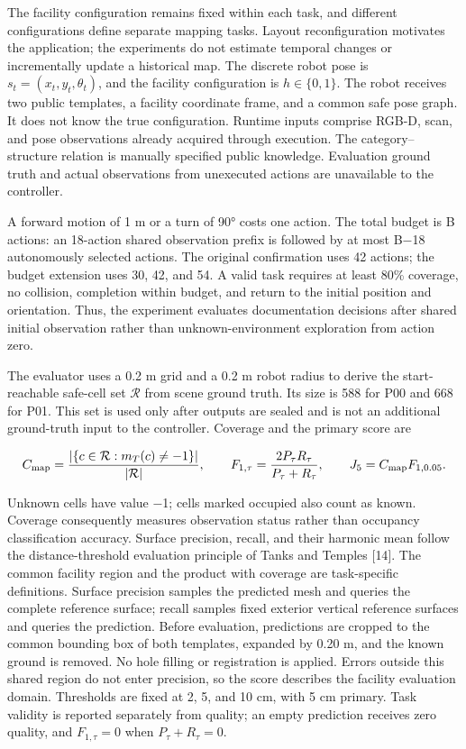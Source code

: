 \documentclass[11pt,a4paper]{article}
\begin{document}
The facility configuration remains fixed within each task, and different configurations define separate mapping tasks. Layout reconfiguration motivates the application; the experiments do not estimate temporal changes or incrementally update a historical map. The discrete robot pose is \(s_t=(x_t,y_t,\theta_t)\), and the facility configuration is \(h\in\{0,1\}\). The robot receives two public templates, a facility coordinate frame, and a common safe pose graph. It does not know the true configuration. Runtime inputs comprise RGB-D, scan, and pose observations already acquired through execution. The category--structure relation is manually specified public knowledge. Evaluation ground truth and actual observations from unexecuted actions are unavailable to the controller.

A forward motion of 1 m or a turn of 90° costs one action. The total budget is B actions: an 18-action shared observation prefix is followed by at most B−18 autonomously selected actions. The original confirmation uses 42 actions; the budget extension uses 30, 42, and 54. A valid task requires at least 80\% coverage, no collision, completion within budget, and return to the initial position and orientation. Thus, the experiment evaluates documentation decisions after shared initial observation rather than unknown-environment exploration from action zero.

The evaluator uses a 0.2 m grid and a 0.2 m robot radius to derive the start-reachable safe-cell set \(\mathcal R\) from scene ground truth. Its size is 588 for P00 and 668 for P01. This set is used only after outputs are sealed and is not an additional ground-truth input to the controller. Coverage and the primary score are

\[
C_{\rm map}=\frac{|\{c\in\mathcal R:m_T(c)\ne-1\}|}{|\mathcal R|},
\qquad F_{1,\tau}=\frac{2P_\tau R_\tau}{P_\tau+R_\tau},
\qquad J_5=C_{\rm map}F_{1,0.05}.
\]

Unknown cells have value −1; cells marked occupied also count as known. Coverage consequently measures observation status rather than occupancy classification accuracy. Surface precision, recall, and their harmonic mean follow the distance-threshold evaluation principle of Tanks and Temples {[}14{]}. The common facility region and the product with coverage are task-specific definitions. Surface precision samples the predicted mesh and queries the complete reference surface; recall samples fixed exterior vertical reference surfaces and queries the prediction. Before evaluation, predictions are cropped to the common bounding box of both templates, expanded by 0.20 m, and the known ground is removed. No hole filling or registration is applied. Errors outside this shared region do not enter precision, so the score describes the facility evaluation domain. Thresholds are fixed at 2, 5, and 10 cm, with 5 cm primary. Task validity is reported separately from quality; an empty prediction receives zero quality, and \(F_{1,\tau}=0\) when \(P_\tau+R_\tau=0\).
\end{document}
